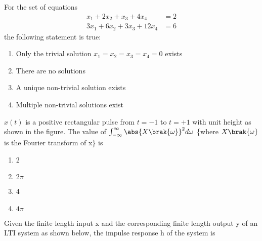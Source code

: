 \item For the set of equations 
\begin{align*}
    x_1 + 2x_2 + x_3 + 4x_4 & = 2 \\
    3x_1 + 6x_2 + 3x_3 + 12x_4 & = 6
\end{align*}
the following statement is true:
 \begin{enumerate}
     \item Only the trivial solution $x_1 = x_2 = x_3 = x_4 = 0$ exists
     \item There are no solutions
     \item A unique non-trivial solution exists
     \item  Multiple non-trivial solutions exist \\
 \end{enumerate}
\item $x(t)$ is a positive rectangular pulse from $t = -1$ to $t = +1$ with unit height as shown in the figure. The value of $\int_{-\infty}^{\infty}\abs{X\brak{\omega}}^2 d\omega$ \{where $X\brak{\omega}$ is the Fourier transform of x\} is 
\begin{figure}[!ht]
\centering
\resizebox{0.5\textwidth}{!}{%

}%
\end{figure}
\begin{enumerate}
    \item 2
    \item $2\pi$
    \item 4
    \item $4\pi$ \\
\end{enumerate}
\item Given the finite length input x and the corresponding finite length output y of an LTI system as shown below, the impulse response h of the system is 
\begin{figure}[!ht]
\centering
\resizebox{0.5\textwidth}{!}{%

}%
\end{figure}

